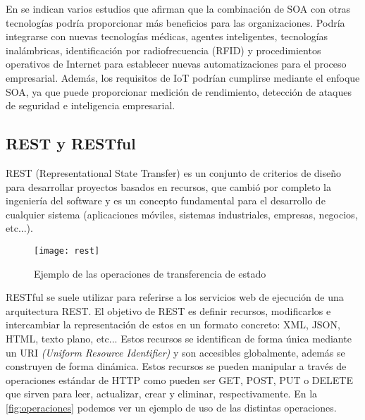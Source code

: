 En \cite{soa} se indican varios estudios que afirman que la combinación de SOA con otras tecnologías podría proporcionar más beneficios para las organizaciones. Podría integrarse con nuevas tecnologías médicas, agentes inteligentes, tecnologías inalámbricas, identificación por radiofrecuencia (RFID) y procedimientos operativos de Internet para establecer nuevas automatizaciones para el proceso empresarial. Además, los requisitos de IoT podrían cumplirse mediante el enfoque SOA, ya que puede proporcionar medición de rendimiento, detección de ataques de seguridad e inteligencia empresarial.

\subsection{REST y RESTful}
REST (Representational State Transfer) es un conjunto de criterios de diseño para desarrollar proyectos basados en recursos, que cambió por completo la ingeniería del software y es un concepto fundamental para el desarrollo de cualquier sistema (aplicaciones móviles, sistemas industriales, empresas, negocios, etc...).
\begin{figure}[h!]
	\centering
	\texttt{[image: rest]}
	\caption{Ejemplo de las operaciones de transferencia de estado}
	\label{fig:operaciones}
\end{figure} RESTful se suele utilizar para referirse a los servicios web de ejecución de una arquitectura REST.
El objetivo de REST es definir recursos, modificarlos e intercambiar la representación de estos en un formato concreto: XML, JSON, HTML, texto plano, etc... Estos recursos se identifican de forma única mediante un URI \textit{(Uniform Resource Identifier)} y son accesibles globalmente, además se construyen de forma dinámica. Estos recursos se pueden manipular a través de operaciones estándar de HTTP como pueden ser GET, POST, PUT o DELETE que sirven para leer, actualizar, crear y eliminar, respectivamente.
En la \autoref{fig:operaciones} podemos ver un ejemplo de uso de las distintas operaciones.

